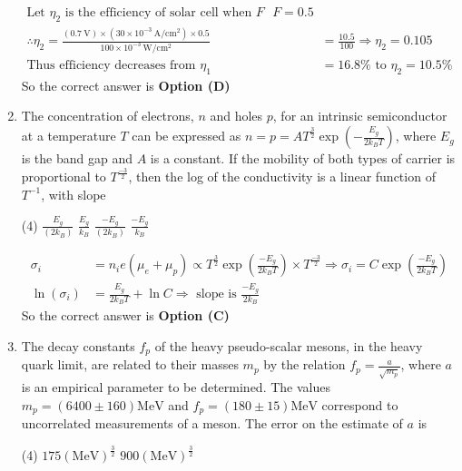 \begin{enumerate}
\begin{answer}
\begin{align*}
\text{Let $\eta_{2}$ is the efficiency of solar cell when $F$ } F=0.5\\
\therefore \eta_{2}=\frac{(0.7 \mathrm{~V}) \times\left(30 \times 10^{-3} \mathrm{~A} / \mathrm{cm}^{2}\right) \times 0.5}{100 \times 10^{-3} \mathrm{~W} / \mathrm{cm}^{2}}&=\frac{10.5}{100} \Rightarrow \eta_{2}=0.105\\
\text{Thus efficiency decreases from }\eta_{1}&=16.8 \%\text{ to }\eta_{2}=10.5 \%
\end{align*}
So the correct answer is \textbf{Option (D)}
\end{answer}
	\item The concentration of electrons, $n$ and holes $p$, for an intrinsic semiconductor at a temperature $T$ can be expressed as $n=p=A T^{\frac{3}{2}} \exp \left(-\frac{E_{g}}{2 k_{B} T}\right)$, where $E_{g}$ is the band gap and $A$ is a constant. If the mobility of both types of carrier is proportional to $T^{\frac{-3}{2}}$, then the log of the conductivity is a linear function of $T^{-1}$, with slope
{	}
\begin{tasks}(4)
\task[\textbf{A.}]$\frac{E_{g}}{\left(2 k_{B}\right)}$
\task[\textbf{B.}] $\frac{E_{g}}{k_{B}}$
\task[\textbf{C.}] $\frac{-E_{g}}{\left(2 k_{B}\right)}$
\task[\textbf{D.}] $\frac{-E_{g}}{k_{B}}$
\end{tasks}
\begin{answer}
\begin{align*}
\sigma_{i}&=n_{i} e\left(\mu_{e}+\mu_{p}\right) \propto T^{\frac{3}{2}} \exp \left(\frac{-E_{g}}{2 k_{B} T}\right) \times T^{\frac{-3}{2}} \Rightarrow \sigma_{i}=C \exp \left(\frac{-E_{g}}{2 k_{B} T}\right)\\
\ln \left(\sigma_{i}\right)&=\frac{E_{g}}{2 k_{B} T}+\ln C \Rightarrow\text{ slope is } \frac{-E_{g}}{2 k_{B}}
\end{align*}
So the correct answer is \textbf{Option (C)}
\end{answer}
	\item The decay constants $f_{p}$ of the heavy pseudo-scalar mesons, in the heavy quark limit, are related to their masses $m_{p}$ by the relation $f_{p}=\frac{a}{\sqrt{m_{p}}}$, where $a$ is an empirical parameter to be determined. The values $m_{p}=(6400 \pm 160) \mathrm{MeV}$ and $f_{p}=(180 \pm 15) \mathrm{MeV}$ correspond to uncorrelated measurements of a meson. The error on the estimate of $a$ is
{	}
\begin{tasks}(4)
\task[\textbf{A.}] $175(\mathrm{MeV})^{\frac{3}{2}}$
\task[\textbf{B.}] $900(\mathrm{MeV})^{\frac{3}{2}}$

\end{tasks}
\end{enumerate}

